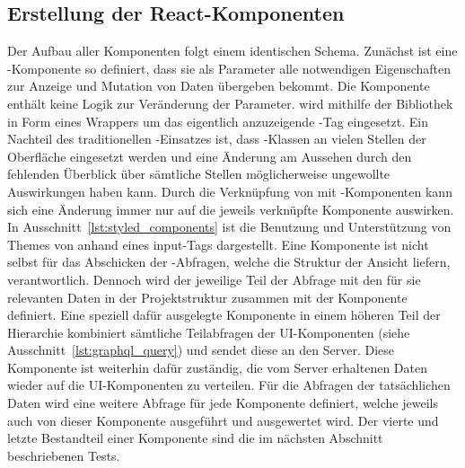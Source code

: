 \subsection{Erstellung der React-Komponenten}
Der Aufbau aller Komponenten folgt einem identischen Schema. Zunächst ist eine -Komponente so definiert, dass sie als Parameter alle notwendigen Eigenschaften zur Anzeige und Mutation von Daten übergeben bekommt. Die Komponente enthält keine Logik zur Veränderung der Parameter.
 wird mithilfe der Bibliothek  in Form eines Wrappers um das eigentlich anzuzeigende -Tag eingesetzt. Ein Nachteil des traditionellen -Einsatzes ist, dass -Klassen an vielen Stellen der Oberfläche eingesetzt werden und eine Änderung am Aussehen durch den fehlenden Überblick über sämtliche Stellen möglicherweise ungewollte Auswirkungen haben kann. Durch die Verknüpfung von  mit -Komponenten kann sich eine Änderung immer nur auf die jeweils verknüpfte Komponente auswirken. In Ausschnitt~\ref{lst:styled_components} ist die Benutzung und Unterstützung von Themes von  anhand eines  input-Tags dargestellt.
Eine Komponente ist nicht selbst für das Abschicken der -Abfragen, welche die Struktur der Ansicht liefern, verantwortlich. Dennoch wird der jeweilige Teil der Abfrage mit den für sie relevanten Daten in der Projektstruktur zusammen mit der Komponente definiert. Eine speziell dafür ausgelegte Komponente in einem höheren Teil der Hierarchie kombiniert sämtliche Teilabfragen der UI-Komponenten (siehe Ausschnitt~\ref{lst:graphql_query}) und sendet diese an den Server. Diese Komponente ist weiterhin dafür zuständig, die vom Server erhaltenen Daten wieder auf die UI-Komponenten zu verteilen. Für die Abfragen der tatsächlichen Daten wird eine weitere Abfrage für jede Komponente definiert, welche jeweils auch von dieser Komponente ausgeführt und ausgewertet wird.
Der vierte und letzte Bestandteil einer Komponente sind die im nächsten Abschnitt beschriebenen Tests.





